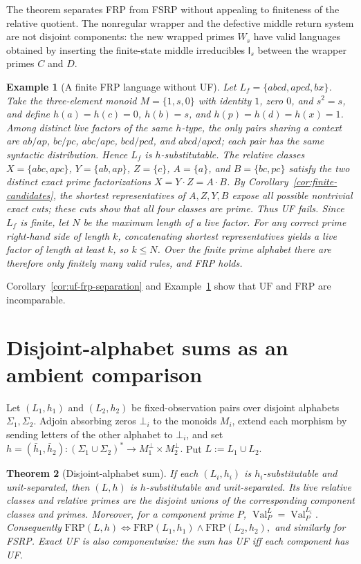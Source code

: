 \documentclass[11pt,a4paper]{article}
\newtheorem{theorem}{Theorem}[section]
\newtheorem{example}[theorem]{Example}
\newcommand{\Val}{\operatorname{Val}}
\begin{document}
The theorem separates FRP from FSRP without appealing to finiteness of the
relative quotient.  The nonregular wrapper and the defective middle return
system are not disjoint components: the new wrapped primes $W_s$ have valid
languages obtained by inserting the finite-state middle irreducibles
$\mathsf I_s$ between the wrapper primes $C$ and $D$.

\begin{example}[A finite FRP language without UF]
\label{ex:nonuf-frp}
Let $L_f=\{abcd,apcd,bx\}$.  Take the three-element monoid $M=\{1,s,0\}$ with identity $1$, zero $0$, and $s^2=s$, and define $h(a)=h(c)=0$, $h(b)=s$, and $h(p)=h(d)=h(x)=1$.  Among distinct live factors of the same $h$-type, the only pairs sharing a context are $ab/ap$, $bc/pc$, $abc/apc$, $bcd/pcd$, and $abcd/apcd$; each pair has the same syntactic distribution.  Hence $L_f$ is $h$-substitutable.  The relative classes $X=\{abc,apc\}$, $Y=\{ab,ap\}$, $Z=\{c\}$, $A=\{a\}$, and $B=\{bc,pc\}$ satisfy the two distinct exact prime factorizations $X=Y\cdot Z=A\cdot B$.  By Corollary~\ref{cor:finite-candidates}, the shortest representatives of $A,Z,Y,B$ expose all possible nontrivial exact cuts; these cuts show that all four classes are prime.  Thus UF fails.  Since $L_f$ is finite, let $N$ be the maximum length of a live factor.  For any correct prime right-hand side of length $k$, concatenating shortest representatives yields a live factor of length at least $k$, so $k\le N$.  Over the finite prime alphabet there are therefore only finitely many valid rules, and FRP holds.
\end{example}

Corollary~\ref{cor:uf-frp-separation} and Example~\ref{ex:nonuf-frp} show that $\mathrm{UF}$ and $\mathrm{FRP}$ are incomparable.

\section{Disjoint-alphabet sums as an ambient comparison}
\label{sec:sum}

Let $(L_1,h_1)$ and $(L_2,h_2)$ be fixed-observation pairs over disjoint alphabets $\Sigma_1,\Sigma_2$.  Adjoin absorbing zeros $\bot_i$ to the monoids $M_i$, extend each morphism by sending letters of the other alphabet to $\bot_i$, and set
\(h=(\bar h_1,\bar h_2): (\Sigma_1\cup\Sigma_2)^* \to M_1^\bot\times M_2^\bot.\)
Put
\(L:=L_1\cup L_2.\)

\begin{theorem}[Disjoint-alphabet sum]
If each $(L_i,h_i)$ is $h_i$-substitutable and unit-separated, then $(L,h)$ is $h$-substitutable and unit-separated.  Its live relative classes and relative primes are the disjoint unions of the corresponding component classes and primes.  Moreover, for a component prime $P$,
\(\Val^{L}_P=\Val^{L_i}_P.\)
Consequently
\(\mathrm{FRP}(L,h) \iff \mathrm{FRP}(L_1,h_1)\wedge\mathrm{FRP}(L_2,h_2),\)
and similarly for FSRP.  Exact UF is also componentwise: the sum has UF iff each component has UF.
\end{theorem}
\end{document}
